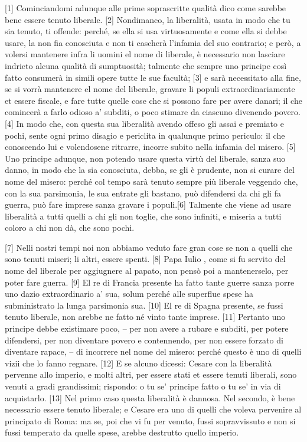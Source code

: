 {[}1{]} Cominciandomi adunque alle prime soprascritte qualità dico come
sarebbe bene essere tenuto liberale. {[}2{]} Nondimanco, la liberalità,
usata in modo che tu sia tenuto, ti offende: perché, se ella si usa
virtuosamente e come ella si debbe usare, la non fia conosciuta e non ti
cascherà l'infamia del suo contrario; e però, a volersi mantenere infra
li uomini el nome di liberale, è necessario non lasciare indrieto alcuna
qualità di sumptuosità; talmente che sempre uno principe così fatto
consumerà in simili opere tutte le sue facultà; {[}3{]} e sarà
necessitato alla fine, se si vorrà mantenere el nome del liberale,
gravare li populi extraordinariamente et essere fiscale, e fare tutte
quelle cose che si possono fare per avere danari; il che comincerà a
farlo odioso a' subditi, o poco stimare da ciascuno divenendo povero.
{[}4{]} In modo che, con questa sua liberalità avendo offeso gli assai e
premiato e pochi, sente ogni primo disagio e periclita in qualunque
primo periculo: il che conoscendo lui e volendosene ritrarre, incorre
subito nella infamia del misero. {[}5{]} Uno principe adunque, non
potendo usare questa virtù del liberale, sanza suo danno, in modo che la
sia conosciuta, debba, se gli è prudente, non si curare del nome del
misero: perché col tempo sarà tenuto sempre più liberale veggendo che,
con la sua parsimonia, le sua entrate gli bastano, può difendersi da chi
gli fa guerra, può fare imprese sanza gravare i populi.{[}6{]} Talmente
che viene ad usare liberalità a tutti quelli a chi gli non toglie, che
sono infiniti, e miseria a tutti coloro a chi non dà, che sono pochi.

{[}7{]} Nelli nostri tempi noi non abbiamo veduto fare gran cose se non
a quelli che sono tenuti miseri; li altri, essere spenti. {[}8{]} Papa
Iulio , come si fu servito del nome del liberale per aggiugnere al
papato, non pensò poi a mantenerselo, per poter fare guerra. {[}9{]} El
re di Francia presente ha fatto tante guerre sanza porre uno dazio
extraordinario a' sua, solum perché alle superflue spese ha
subministrato la lunga parsimonia sua. {[}10{]} El re di Spagna
presente, se fussi tenuto liberale, non arebbe ne fatto né vinto tante
imprese. {[}11{]} Pertanto uno principe debbe existimare poco, -- per
non avere a rubare e subditi, per potere difendersi, per non diventare
povero e contennendo, per non essere forzato di diventare rapace, -- di
incorrere nel nome del misero: perché questo è uno di quelli vizii che
lo fanno regnare. {[}12{]} E se alcuno dicessi: Cesare con la liberalità
pervenne allo imperio, e molti altri, per essere stati et essere tenuti
liberali, sono venuti a gradi grandissimi; rispondo: o tu se' principe
fatto o tu se' in via di acquistarlo. {[}13{]} Nel primo caso questa
liberalità è dannosa. Nel secondo, è bene necessario essere tenuto
liberale; e Cesare era uno di quelli che voleva pervenire al principato
di Roma: ma se, poi che vi fu per venuto, fussi sopravvissuto e non si
fussi temperato da quelle spese, arebbe destrutto quello imperio.


